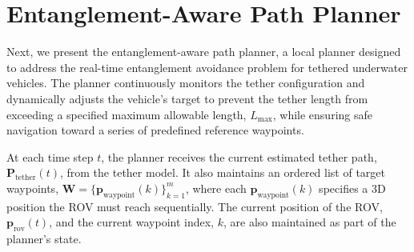 







\section{Entanglement-Aware Path Planner}
\label{sec:planner}

Next, we present the entanglement-aware path planner, a local planner designed to address the real-time entanglement avoidance problem for tethered underwater vehicles. The planner continuously monitors the tether configuration and dynamically adjusts the vehicle’s target to prevent the tether length from exceeding a specified maximum allowable length, \( L_{\max} \), while ensuring safe navigation toward a series of predefined reference waypoints.

At each time step \( t \), the planner receives the current estimated tether path, \(\mathbf{P}_{\mathrm{tether}}(t)\), from the tether model. It also maintains an ordered list of target waypoints, \(\mathbf{W} = \{\mathbf{p}_{\text{waypoint}}(k)\}_{k=1}^m\), where each \(\mathbf{p}_{\text{waypoint}}(k)\) specifies a 3D position the ROV must reach sequentially. The current position of the ROV, \(\mathbf{p}_{\text{rov}}(t)\), and the current waypoint index, \(k\), are also maintained as part of the planner’s state.

